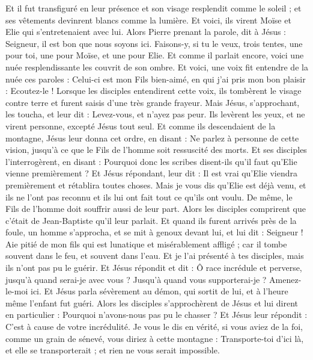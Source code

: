 \begin{multicols}{2}
Et il fut transfiguré en leur présence et son visage resplendit comme le soleil ; et ses vêtements devinrent blancs comme la lumière.
Et voici, ils virent Moïse et Elie qui s'entretenaient avec lui.
Alors Pierre prenant la parole, dit à Jésus : Seigneur, il est bon que nous soyons ici. Faisons-y, si tu le veux, trois tentes, une pour toi, une pour Moïse, et une pour Elie.
Et comme il parlait encore, voici une nuée resplendissante les couvrit de son ombre. Et voici, une voix fit entendre de la nuée ces paroles : Celui-ci est mon Fils bien-aimé, en qui j'ai pris mon bon plaisir : Ecoutez-le !
Lorsque les disciples entendirent cette voix, ils tombèrent le visage contre terre et furent saisis d’une très grande frayeur.
Mais Jésus, s'approchant, les toucha, et leur dit : Levez-vous, et n'ayez pas peur.
Ils levèrent les yeux, et ne virent personne, excepté Jésus tout seul.
Et comme ils descendaient de la montagne, Jésus leur donna cet ordre, en disant : Ne parlez à personne de cette vision, jusqu'à ce que le Fils de l'homme soit ressuscité des morts.
Et ses disciples l'interrogèrent, en disant : Pourquoi donc les scribes disent-ils qu'il faut qu'Elie vienne premièrement ?
Et Jésus répondant, leur dit : Il est vrai qu'Elie viendra premièrement et rétablira toutes choses.
Mais je vous dis qu'Elie est déjà venu, et ils ne l'ont pas reconnu et ils lui ont fait tout ce qu’ils ont voulu. De même, le Fils de l'homme doit souffrir aussi de leur part.
Alors les disciples comprirent que c'était de Jean-Baptiste qu'il leur parlait.
Et quand ils furent arrivés près de la foule, un homme s'approcha, et se mit à genoux devant lui,
et lui dit : Seigneur ! Aie pitié de mon fils qui est lunatique et misérablement affligé ; car il tombe souvent dans le feu, et souvent dans l'eau.
Et je l'ai présenté à tes disciples, mais ils n’ont pas pu le guérir.
Et Jésus répondit et dit : Ô race incrédule et perverse, jusqu’à quand serai-je avec vous ? Jusqu’à quand vous supporterai-je ? Amenez-le-moi ici.
Et Jésus parla sévèrement au démon, qui sortit de lui, et à l'heure même l'enfant fut guéri.
Alors les disciples s’approchèrent de Jésus et lui dirent en particulier : Pourquoi n’avons-nous pas pu le chasser ?
Et Jésus leur répondit : C'est à cause de votre incrédulité. Je vous le dis en vérité, si vous aviez de la foi, comme un grain de sénevé, vous diriez à cette montagne : Transporte-toi d'ici là, et elle se transporterait ; et rien ne vous serait impossible.

\end{multicols}
